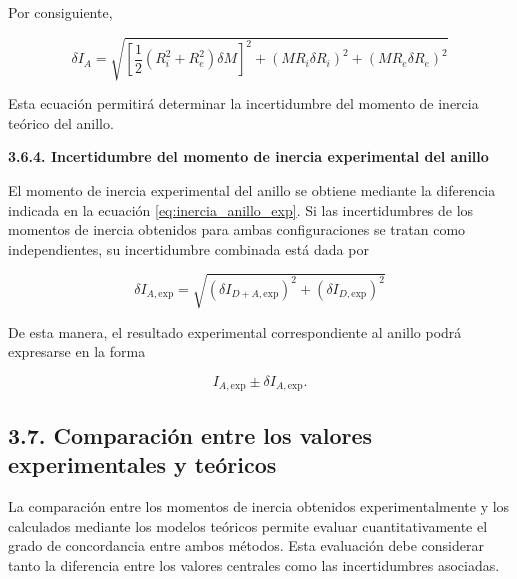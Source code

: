 \documentclass[11pt,a4paper]{article}
\begin{document}
\begin{list}{}{\leftmargin=1.2cm\rightmargin=0cm}
Por consiguiente,

\begin{equation}
\delta I_A=
\sqrt{
\left[
\frac{1}{2}(R_i^2+R_e^2)\delta M
\right]^2+
(MR_i\delta R_i)^2+
(MR_e\delta R_e)^2
}
\label{eq:incertidumbre_anillo_teo}
\end{equation}

Esta ecuación permitirá determinar la incertidumbre del momento de inercia
teórico del anillo.



\textbf{3.6.4. Incertidumbre del momento de inercia experimental del anillo}

\vspace{0.3em}

El momento de inercia experimental del anillo se obtiene mediante la
diferencia indicada en la ecuación \eqref{eq:inercia_anillo_exp}. Si las
incertidumbres de los momentos de inercia obtenidos para ambas
configuraciones se tratan como independientes, su incertidumbre combinada
está dada por

\begin{equation}
\delta I_{A,\mathrm{exp}}
=
\sqrt{
(\delta I_{D+A,\mathrm{exp}})^2+
(\delta I_{D,\mathrm{exp}})^2
}
\label{eq:incertidumbre_anillo_exp}
\end{equation}

De esta manera, el resultado experimental correspondiente al anillo podrá
expresarse en la forma

\[
I_{A,\mathrm{exp}}
\pm
\delta I_{A,\mathrm{exp}}.
\]

\end{list}



\subsection*{3.7. Comparación entre los valores experimentales y teóricos}

La comparación entre los momentos de inercia obtenidos experimentalmente
y los calculados mediante los modelos teóricos permite evaluar
cuantitativamente el grado de concordancia entre ambos métodos. Esta
evaluación debe considerar tanto la diferencia entre los valores centrales
como las incertidumbres asociadas.
\end{document}
